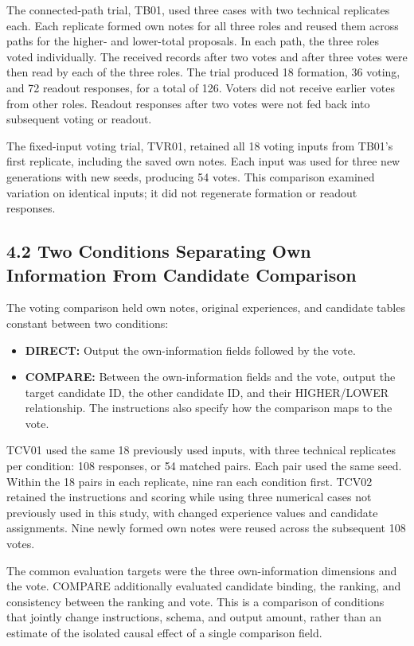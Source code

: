 \documentclass[10pt,a4paper]{article}
\newcommand{\tightlist}{\setlength{\itemsep}{1pt}\setlength{\parskip}{0pt}}
\begin{document}
The connected-path trial, TB01, used three cases with two technical replicates each. Each replicate formed own notes for all three roles and reused them across paths for the higher- and lower-total proposals. In each path, the three roles voted individually. The received records after two votes and after three votes were then read by each of the three roles. The trial produced 18 formation, 36 voting, and 72 readout responses, for a total of 126. Voters did not receive earlier votes from other roles. Readout responses after two votes were not fed back into subsequent voting or readout.

The fixed-input voting trial, TVR01, retained all 18 voting inputs from TB01's first replicate, including the saved own notes. Each input was used for three new generations with new seeds, producing 54 votes. This comparison examined variation on identical inputs; it did not regenerate formation or readout responses.

\subsection{4.2 Two Conditions Separating Own Information From Candidate Comparison}\label{paper-04-two-conditions-separating-own-information-from-candidate-comparison}

The voting comparison held own notes, original experiences, and candidate tables constant between two conditions:

\begin{itemize}
\tightlist
\item
  \textbf{DIRECT:} Output the own-information fields followed by the vote.
\item
  \textbf{COMPARE:} Between the own-information fields and the vote, output the target candidate ID, the other candidate ID, and their HIGHER/LOWER relationship. The instructions also specify how the comparison maps to the vote.
\end{itemize}

TCV01 used the same 18 previously used inputs, with three technical replicates per condition: 108 responses, or 54 matched pairs. Each pair used the same seed. Within the 18 pairs in each replicate, nine ran each condition first. TCV02 retained the instructions and scoring while using three numerical cases not previously used in this study, with changed experience values and candidate assignments. Nine newly formed own notes were reused across the subsequent 108 votes.

The common evaluation targets were the three own-information dimensions and the vote. COMPARE additionally evaluated candidate binding, the ranking, and consistency between the ranking and vote. This is a comparison of conditions that jointly change instructions, schema, and output amount, rather than an estimate of the isolated causal effect of a single comparison field.
\end{document}
